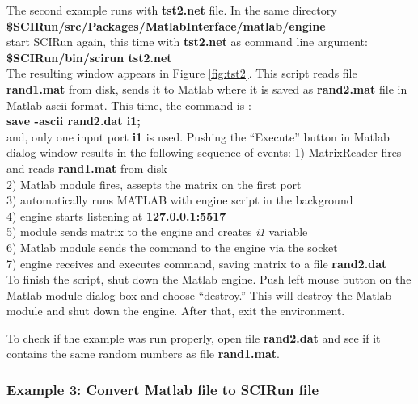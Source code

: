 The second example runs with {\bf tst2.net} file. In the same
directory \\
{\bf \$SCIRun/src/Packages/MatlabInterface/matlab/engine } \\
start SCIRun again, this time with {\bf tst2.net} as command line argument: \\
{\bf \$SCIRun/bin/scirun  tst2.net} \\
The resulting window appears in Figure \ref{fig:tst2}. This
script reads \sr{} file {\bf rand1.mat} from disk, sends
it to Matlab where it is saved as {\bf rand2.mat} file
in Matlab ascii format. This time, the command is : \\
{\bf save -ascii rand2.dat i1;} \\
and, only one input port {\bf i1} is used. Pushing the
``Execute'' button in Matlab dialog window results in
the following sequence of events:
1) MatrixReader fires and reads {\bf rand1.mat} from disk \\
2) Matlab module fires, assepts the matrix on the first port \\
3) automatically runs MATLAB with engine script in the background  \\
4) engine starts listening at {\bf 127.0.0.1:5517} \\
5) module sends matrix to the engine and creates {\it i1} variable\\
6) Matlab module sends the command to the engine via the socket\\
7) engine receives and executes command, saving matrix to a file {\bf rand2.dat} \\

To finish the script, shut down the Matlab engine.
Push left mouse button on the
Matlab module dialog box and choose ``destroy.'' This will destroy
the Matlab module and shut down the engine. After that, exit
the \sr{} environment.

To check if the example was run properly, open file {\bf rand2.dat}
and see if it contains the same random numbers as file {\bf rand1.mat}.

\subsubsection{Example 3: Convert Matlab file to SCIRun file} \indent

